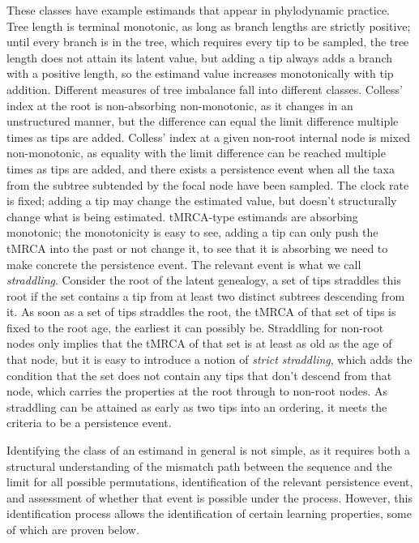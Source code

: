 \documentclass{article}
\begin{document}
These classes have example estimands that appear in phylodynamic practice. Tree length is terminal monotonic, as long as branch lengths are strictly positive; until every branch is in the tree, which requires every tip to be sampled, the tree length does not attain its latent value, but adding a tip always adds a branch with a positive length, so the estimand value increases monotonically with tip addition. Different measures of tree imbalance fall into different classes. Colless' index \citep{colless1982} at the root is non-absorbing non-monotonic, as it changes in an unstructured manner, but the difference can equal the limit difference multiple times as tips are added. Colless' index at a given non-root internal node is mixed non-monotonic, as equality with the limit difference can be reached multiple times as tips are added, and there exists a persistence event when all the taxa from the subtree subtended by the focal node have been sampled. The clock rate is fixed; adding a tip may change the estimated value, but doesn't structurally change what is being estimated. tMRCA-type estimands are absorbing monotonic; the monotonicity is easy to see, adding a tip can only push the tMRCA into the past or not change it, to see that it is absorbing we need to make concrete the persistence event. The relevant event is what we call \textit{straddling}. Consider the root of the latent genealogy, a set of tips straddles this root if the set contains a tip from at least two distinct subtrees descending from it. As soon as a set of tips straddles the root, the tMRCA of that set of tips is fixed to the root age, the earliest it can possibly be. Straddling for non-root nodes only implies that the tMRCA of that set is at least as old as the age of that node, but it is easy to introduce a notion of \textit{strict straddling}, which adds the condition that the set does not contain any tips that don't descend from that node, which carries the properties at the root through to non-root nodes. As straddling can be attained as early as two tips into an ordering, it meets the criteria to be a persistence event.

Identifying the class of an estimand in general is not simple, as it requires both a structural understanding of the mismatch path between the sequence and the limit for all possible permutations, identification of the relevant persistence event, and assessment of whether that event is possible under the process. However, this identification process allows the identification of certain learning properties, some of which are proven below.
\end{document}
